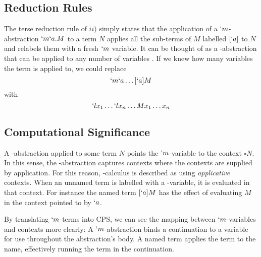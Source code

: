   \subsection{Reduction Rules}
  \begin{figure}[H]
  \end{figure}

  The terse reduction rule of $ii)$ simply states that the application of a $`m$-abstraction $`m`a.M$ to a term $N$ applies all the sub-terms of $M$ labelled $[`a]$ to $N$ and relabels them with a fresh $`m$ variable.
  It can be thought of as a \lam-abstraction that can be applied to any number of variables \cite{Parigot92}.
  If we knew how many variables the term is applied to, we could replace
  \[ `m`a\dots[`a]M \]
  with 
  \[ `lx_1\dots`lx_n\dots Mx_1\dots x_n \]
  
  \subsection{Computational Significance}

  A \lmu-abstraction applied to some term $N$ points the $`m$-variable to the context $\square N$.
  In this sense, the \lmu-abstraction captures contexts where the contexts are supplied by application.
  For this reason, \lmu-calculus is described as using \emph{applicative} contexts.
  When an unnamed term is labelled with a \lmu-variable, it is evaluated in that context. 
  For instance the named term $[`a]M$ has the effect of evaluating $M$ in the context pointed to by $`a$.
  
  By translating $`m$-terms into CPS, we can see the mapping between $`m$-variables and contexts more clearly:
  A $`m$-abstraction binds a continuation to a variable for use throughout the abstraction's body.
  A named term applies the term to the name, effectively running the term in the continuation.
  
